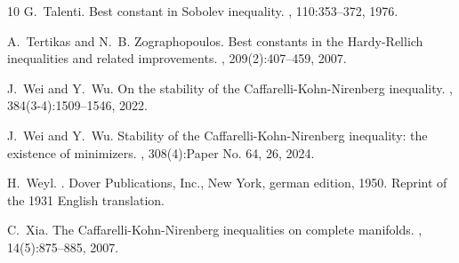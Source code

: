 \documentclass[a4paper,12pt]{article}
\theoremstyle{plain}
\theoremstyle{definition}
\theoremstyle{remark}
\numberwithin{equation}{section}
\begin{document}
\begin{thebibliography}{10}
G.~Talenti.
\newblock Best constant in {S}obolev inequality.
, 110:353--372, 1976.

A.~Tertikas and N.~B. Zographopoulos.
\newblock Best constants in the {H}ardy-{R}ellich inequalities and related
  improvements.
, 209(2):407--459, 2007.

J.~Wei and Y.~Wu.
\newblock On the stability of the {C}affarelli-{K}ohn-{N}irenberg inequality.
, 384(3-4):1509--1546, 2022.

J.~Wei and Y.~Wu.
\newblock Stability of the {C}affarelli-{K}ohn-{N}irenberg inequality: the
  existence of minimizers.
, 308(4):Paper No. 64, 26, 2024.

H.~Weyl.
.
\newblock Dover Publications, Inc., New York, german edition, 1950.
\newblock Reprint of the 1931 English translation.

C.~Xia.
\newblock The {C}affarelli-{K}ohn-{N}irenberg inequalities on complete
  manifolds.
, 14(5):875--885, 2007.

\end{thebibliography}
\end{document}
